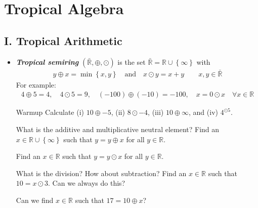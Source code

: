\documentclass{article}
\begin{document}
\section*{Tropical Algebra}

\subsection*{I. Tropical Arithmetic}

\begin{itemize}
	\item \textbf{\emph{Tropical semiring}} \( (\bar{\mathbb{R}}, \oplus, \odot) \) is the set \( \bar{\mathbb{R}} = \mathbb{R} \cup \left\{  \infty \right\}\) with 
	\begin{gather*}
		y \oplus x = \min\left\{ x,y \right\} \quad \text{and} \quad x \odot y = x + y \qquad x,y \in \bar{\mathbb{R}} 
	\end{gather*}
	For example:
		\begin{align*}
			4 \oplus 5 = 4, \quad4 \odot 5 = 9, \quad (-100) \oplus (-10) = -100, \quad x= 0 \odot x \quad \forall x \in \mathbb{R}
		\end{align*}

		\begin{exercise}{Warmup}{}
			Calculate (i) \( 10 \oplus -5 \), (ii) \( 8 \odot -4 \), (iii) \( 10 \oplus \infty \), and (iv) \( 4^{\odot 5} \).
		\end{exercise}

		\begin{exercise}{What is the additive and multiplicative neutral element?}{}
		Find an \( x \in \mathbb{R} \cup \left\{ \infty \right\} \) such that \( y = y \oplus x \) for all \( y \in \mathbb{R} \).

		Find an \( x \in \mathbb{R} \) such that \( y = y \odot x \) for all \( y \in \mathbb{R} \).
		\end{exercise}
	
		\begin{exercise}{What is the division? How about subtraction?}{}
		Find an \( x \in \mathbb{R} \) such that \( 10 = x \odot 3 \). Can we always do this?
		
		Can we find \( x \in \mathbb{R} \) such that \( 17 = 10 \oplus x \)?
		\end{exercise}


\end{itemize}
\end{document}
